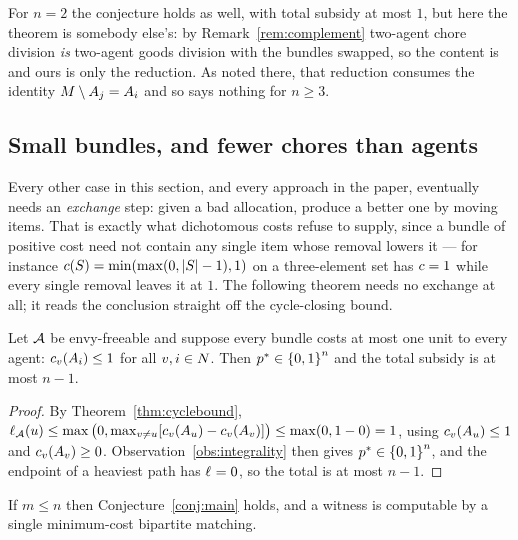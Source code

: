 For $n = 2$ the conjecture holds as well, with total subsidy at most $1$, but
here the theorem is somebody else's: by Remark~\ref{rem:complement} two-agent
chore division \emph{is} two-agent goods division with the bundles swapped, so
the content is~\cite[Theorem~4]{BKNS22} and ours is only the reduction. As noted
there, that reduction consumes the identity $M \setminus A_{j} =
A_{i}$ and so says nothing for $n \ge 3$.

\subsection{Small bundles, and fewer chores than agents}
\label{sec:smallbundle}

Every other case in this section, and every approach in the paper, eventually
needs an \emph{exchange} step: given a bad allocation, produce a better one by
moving items. That is exactly what dichotomous costs refuse to supply, since a
bundle of positive cost need not contain any single item whose removal lowers it
--- for instance $c(S) = \min(\max(0,\left\lvert S\right\rvert-1),1)$ on a three-element set
has $c = 1$ while every single removal leaves it at $1$. The following
theorem needs no exchange at all; it reads the conclusion straight off the
cycle-closing bound.

\begin{theorem}
\label{thm:smallbundle}
Let $\mathcal{A}$ be envy-freeable and suppose every bundle costs at most one unit to
every agent: $c_v(A_{i}) \le 1$ for all $v, i \in N$. Then
$p^{*} \in \left\{0,1\right\}^n$ and the total subsidy is at most $n-1$.
\end{theorem}

\begin{proof}
By Theorem~\ref{thm:cyclebound},
$\ell_{\mathcal{A}}(u) \le \max\big(0, \max_{v \ne u}[c_v(A_{u}) -
c_v(A_{v})]\big) \le \max(0, 1 - 0) = 1$, using
$c_v(A_{u}) \le 1$ and $c_v(A_{v}) \ge 0$.
Observation~\ref{obs:integrality} then gives
$p^{*} \in \left\{0,1\right\}^n$, and the endpoint of a heaviest path has
$\ell_{} = 0$, so the total is at most $n-1$.
\end{proof}

\begin{corollary}
\label{cor:m-le-n}
If $m \le n$ then Conjecture~\ref{conj:main} holds, and a witness is computable
by a single minimum-cost bipartite matching.
\end{corollary}

